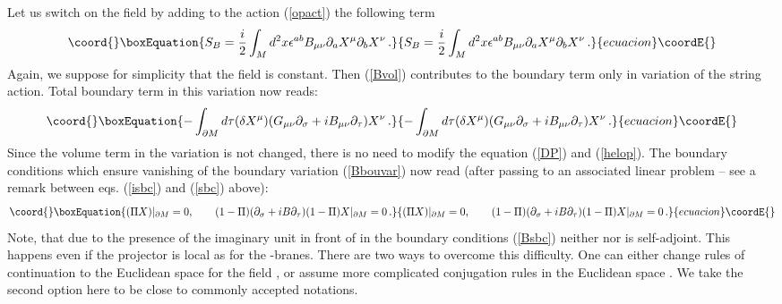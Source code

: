 \documentclass[a4paper,12pt,twoside]{article}
\begin{document}
Let us switch on the \coordHE{} field by adding to the
action (\ref{opact}) the following term
\begin{equation}\coord{}\boxEquation{
S_B=\frac i2 \int_M d^2x \epsilon^{ab}B_{\mu\nu}
\partial_a X^\mu \partial_b X^\nu \,.\label{Bvol}
}{
S_B=\frac i2 \int_M d^2x \epsilon^{ab}B_{\mu\nu}
\partial_a X^\mu \partial_b X^\nu \,.}{ecuacion}\coordE{}\end{equation}
Again, we suppose for simplicity that the \coordHE{} field is constant.
Then (\ref{Bvol}) contributes to the boundary term only in variation
of the string action. Total boundary term in this variation now
reads:
\begin{equation}\coord{}\boxEquation{
-\int_{\partial M} d\tau (\delta X^\mu)(G_{\mu\nu}\partial_\sigma
+iB_{\mu\nu}\partial_\tau )X^\nu \,.\label{Bbouvar} 
}{
-\int_{\partial M} d\tau (\delta X^\mu)(G_{\mu\nu}\partial_\sigma
+iB_{\mu\nu}\partial_\tau )X^\nu \,.}{ecuacion}\coordE{}\end{equation}
Since the volume term in the variation is not changed, there is no
need to modify the equation (\ref{DP}) and (\ref{helop}). The boundary
conditions which ensure vanishing of the boundary variation (\ref{Bbouvar})
now read (after passing to an associated linear problem -- see
a remark between eqs. (\ref{isbc}) and (\ref{sbc}) above):
\begin{equation}\coord{}\boxEquation{
(\Pi X)|_{\partial M}=0,\qquad 
(1-\Pi)(\partial_\sigma +iB\partial_\tau ) 
(1-\Pi )X |_{\partial M}=0 \,.\label{Bsbc}
}{
(\Pi X)|_{\partial M}=0,\qquad 
(1-\Pi)(\partial_\sigma +iB\partial_\tau ) 
(1-\Pi )X |_{\partial M}=0 \,.}{ecuacion}\coordE{}\end{equation}
Note, that due to the presence of the imaginary unit in front
of \coordHE{} in the boundary conditions (\ref{Bsbc}) neither \coordHE{} nor
\myHighlight{$\Delta$}\coordHE{} is self-adjoint. This happens even if the projector
\myHighlight{$\Pi$}\coordHE{} is local as for the \coordHE{}-branes. There are two ways to overcome
this difficulty. One can either change rules of continuation to
the Euclidean space for the \coordHE{} field \cite{Kummer:2000ae}, or
assume more complicated conjugation rules in the Euclidean space
\cite{Osborn:1991gm}. We take the second option here to be close
to commonly accepted notations.
\end{document}
